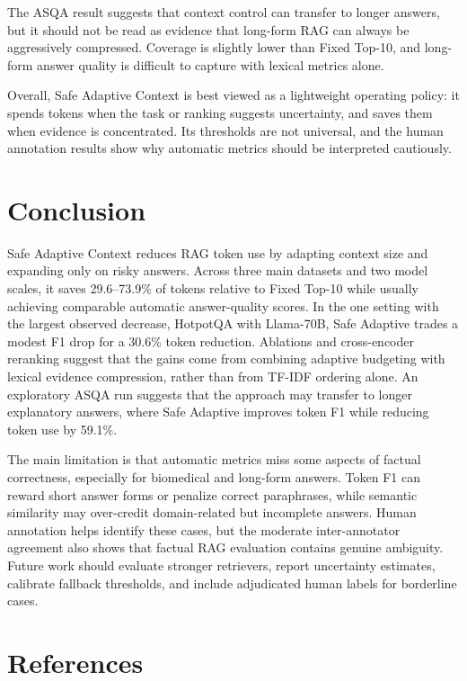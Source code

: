 \documentclass[11pt]{article}
\begin{document}
The ASQA result suggests that context control can transfer to longer answers, but it should not be read as evidence that long-form RAG can always be aggressively compressed. Coverage is slightly lower than Fixed Top-10, and long-form answer quality is difficult to capture with lexical metrics alone.

Overall, Safe Adaptive Context is best viewed as a lightweight operating policy: it spends tokens when the task or ranking suggests uncertainty, and saves them when evidence is concentrated. Its thresholds are not universal, and the human annotation results show why automatic metrics should be interpreted cautiously.



\section{Conclusion}

Safe Adaptive Context reduces RAG token use by adapting context size and expanding only on risky answers. Across three main datasets and two model scales, it saves 29.6--73.9\% of tokens relative to Fixed Top-10 while usually achieving comparable automatic answer-quality scores. In the one setting with the largest observed decrease, HotpotQA with Llama-70B, Safe Adaptive trades a modest F1 drop for a 30.6\% token reduction. Ablations and cross-encoder reranking suggest that the gains come from combining adaptive budgeting with lexical evidence compression, rather than from TF-IDF ordering alone. An exploratory ASQA run suggests that the approach may transfer to longer explanatory answers, where Safe Adaptive improves token F1 while reducing token use by 59.1\%.

The main limitation is that automatic metrics miss some aspects of factual correctness, especially for biomedical and long-form answers. Token F1 can reward short answer forms or penalize correct paraphrases, while semantic similarity may over-credit domain-related but incomplete answers. Human annotation helps identify these cases, but the moderate inter-annotator agreement also shows that factual RAG evaluation contains genuine ambiguity. Future work should evaluate stronger retrievers, report uncertainty estimates, calibrate fallback thresholds, and include adjudicated human labels for borderline cases.

\section*{References}
\end{document}
